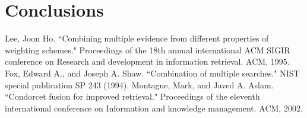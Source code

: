 	\section{Conclusions}
	
	\clearpage
	\begin{thebibliography}{1}
		Lee, Joon Ho. ``Combining multiple evidence from different properties of weighting schemes." Proceedings of the 18th annual international ACM SIGIR conference on Research and development in information retrieval. ACM, 1995.
		Fox, Edward A., and Joseph A. Shaw. ``Combination of multiple searches." NIST special publication SP 243 (1994).
		Montague, Mark, and Javed A. Aslam. ``Condorcet fusion for improved retrieval." Proceedings of the eleventh international conference on Information and knowledge management. ACM, 2002.
		
	\end{thebibliography}
	


